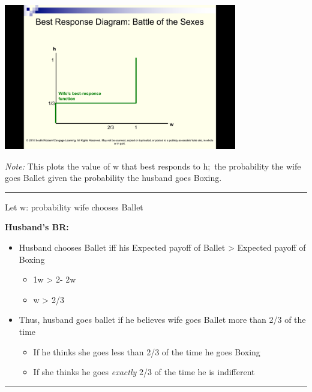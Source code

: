 \documentclass[]{article}
\providecommand{\tightlist}{%
  \setlength{\itemsep}{0pt}\setlength{\parskip}{0pt}}
\begin{document}
\includegraphics[height=2.5in]{picsfigs/bosbr1.png}

\emph{Note:} This plots the value of w that best responds to h;~the probability the wife goes Ballet given the probability the husband goes Boxing.

\begin{center}\rule{0.5\linewidth}{\linethickness}\end{center}

Let w: probability wife chooses Ballet

\textbf{Husband's BR:}

\bigskip

\begin{itemize}
\tightlist
\item
  Husband chooses Ballet iff his Expected payoff of Ballet \textgreater{} Expected payoff of Boxing

  \begin{itemize}
  \tightlist
  \item
    1w \textgreater{} 2- 2w
  \item
    w \textgreater{} 2/3
  \end{itemize}
\item
  Thus, husband goes ballet if he believes wife goes Ballet more than 2/3 of the time

  \begin{itemize}
  \tightlist
  \item
    If he thinks she goes less than 2/3 of the time he goes Boxing
  \item
    If she thinks he goes \emph{exactly} 2/3 of the time he is indifferent
  \end{itemize}
\end{itemize}

\begin{center}\rule{0.5\linewidth}{\linethickness}\end{center}
\end{document}
